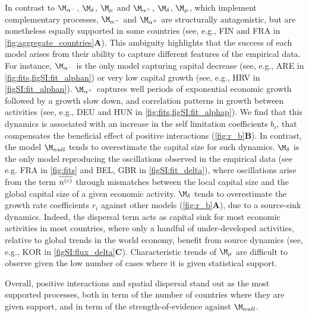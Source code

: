 In contrast to $\modalphan$, $\moddelta$, $\modmu$ and $\modalphap$, $\moddelta$, $\modmu$, which implement complementary processes, $\modalphan$ and $\modalphap$ are structurally antagonistic, but are nonetheless equally supported in some countries (see, e.g., FIN and FRA in \cref{fig:aggregate_countries}\textbf{A}). This ambiguity highlights that the success of each model arises from their ability to capture different features of the empirical data.
% 
For instance, $\modalphan$ is the only model capturing capital decrease (see, e.g., ARE in \cref{fig:fits,figSI:fit_alphan}) or very low capital growth (see, e.g., HRV in \cref{figSI:fit_alphan}).
% 
$\modalphap$  captures well periods of exponential economic growth followed by a growth slow down, and correlation patterns in growth between activities (see, e.g., DEU and HUN in \cref{fig:fits,figSI:fit_alphap}). We find that this dynamics is associated with an increase in the self limitation coefficients $b_i$, that compensates the beneficial effect of positive interactions (\cref{fig:r_b}\textbf{B}). In contrast, the model $\modnull$ tends to overestimate the capital size for such dynamics.
%
$\moddelta$ is the only model reproducing the oscillations observed in the empirical data (see e.g. FRA in \cref{fig:fits} and BEL, GBR in \cref{figSI:fit_delta}), where oscillations arise from the term $\overline{n^{(c)}}$ through mismatches between the local capital size and the global capital size of a given economic activity. $\moddelta$ tends to overestimate the growth rate coefficients $r_i$ against other models (\cref{fig:r_b}\textbf{A}), due to a source-sink dynamics. Indeed, the dispersal term acts as capital sink for most economic activities in most countries, where only a handful of under-developed activities, relative to global trends in the world economy, benefit from source dynamics (see, e.g., KOR in \cref{figSI:flux_delta}\textbf{C}).
% 
Characteristic trends of $\modmu$ are difficult to observe given the low number of cases where it is given statistical support. 

Overall, positive interactions and spatial dispersal stand out as the most supported processes, both in term of the number of countries where they are given support, and in term of the strength-of-evidence against $\modnull$.

